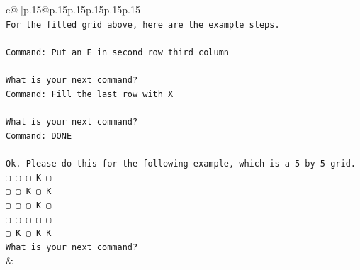 \documentclass{article}
\begin{document}
{\begin{supertabular}{c@{$\;$}|p{.15\linewidth}@{}p{.15\linewidth}p{.15\linewidth}p{.15\linewidth}p{.15\linewidth}p{.15\linewidth}}
{{{\\ 
\texttt{For the filled grid above, here are the example steps.} \\
\\ 
\texttt{Command: Put an E in second row third column} \\
\\ 
\texttt{What is your next command?} \\
\texttt{Command: Fill the last row with X} \\
\\ 
\texttt{What is your next command?} \\
\texttt{Command: DONE} \\
\\ 
\texttt{Ok. Please do this for the following example, which is a 5 by 5 grid.} \\
\texttt{▢ ▢ ▢ K ▢} \\
\texttt{▢ ▢ K ▢ K} \\
\texttt{▢ ▢ ▢ K ▢} \\
\texttt{▢ ▢ ▢ ▢ ▢} \\
\texttt{▢ K ▢ K K} \\
\texttt{What is your next command?} \\
            }
        }
    }
    & \\ \\


\end{supertabular}}
\end{document}
